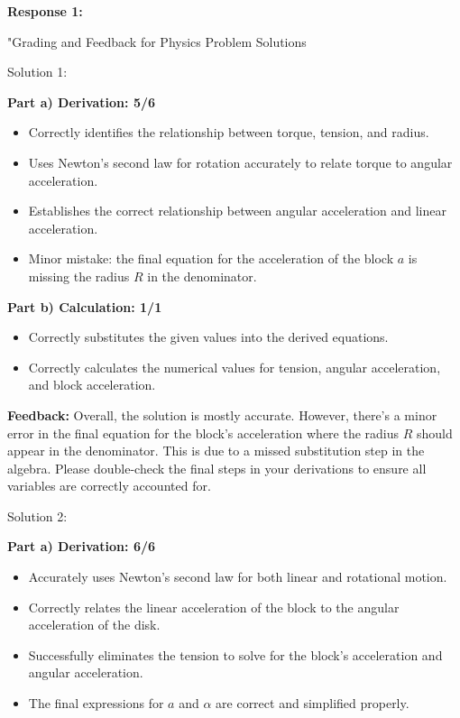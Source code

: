 \documentclass[a4paper,11pt]{article}
\begin{document}
\textbf{Response 1:}

"Grading and Feedback for Physics Problem Solutions

Solution 1:

\textbf{Part a) Derivation: 5/6}
\begin{itemize}
  \item Correctly identifies the relationship between torque, tension, and radius.
  \item Uses Newton's second law for rotation accurately to relate torque to angular acceleration.
  \item Establishes the correct relationship between angular acceleration and linear acceleration.
  \item Minor mistake: the final equation for the acceleration of the block \( a \) is missing the radius \( R \) in the denominator.
\end{itemize}

\textbf{Part b) Calculation: 1/1}
\begin{itemize}
  \item Correctly substitutes the given values into the derived equations.
  \item Correctly calculates the numerical values for tension, angular acceleration, and block acceleration.
\end{itemize}

\textbf{Feedback:}
Overall, the solution is mostly accurate. However, there's a minor error in the final equation for the block's acceleration where the radius \( R \) should appear in the denominator. This is due to a missed substitution step in the algebra. Please double-check the final steps in your derivations to ensure all variables are correctly accounted for.

Solution 2:

\textbf{Part a) Derivation: 6/6}
\begin{itemize}
  \item Accurately uses Newton's second law for both linear and rotational motion.
  \item Correctly relates the linear acceleration of the block to the angular acceleration of the disk.
  \item Successfully eliminates the tension to solve for the block's acceleration and angular acceleration.
  \item The final expressions for \( a \) and \( \alpha \) are correct and simplified properly.
\end{itemize}
\end{document}
